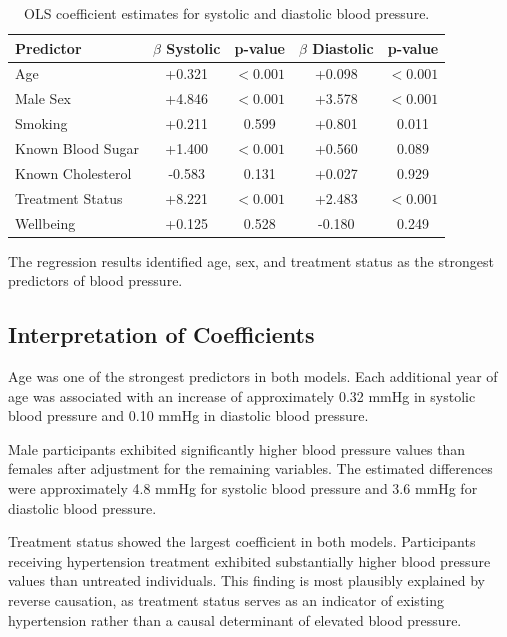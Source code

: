 \documentclass[12pt,a4paper]{article}
\begin{document}
\begin{table}[H]
\centering
\caption{OLS coefficient estimates for systolic and diastolic blood pressure.}
\label{tab:ols_coefficients}
\small
\begin{tabular}{lcccc}
\toprule
Predictor & $\beta$ Systolic & p-value & $\beta$ Diastolic & p-value \\
\midrule
Age & +0.321 & $<0.001$ & +0.098 & $<0.001$ \\

Male Sex & +4.846 & $<0.001$ & +3.578 & $<0.001$ \\

Smoking & +0.211 & 0.599 & +0.801 & 0.011 \\

Known Blood Sugar & +1.400 & $<0.001$ & +0.560 & 0.089 \\

Known Cholesterol & -0.583 & 0.131 & +0.027 & 0.929 \\

Treatment Status & +8.221 & $<0.001$ & +2.483 & $<0.001$ \\

Wellbeing & +0.125 & 0.528 & -0.180 & 0.249 \\
\bottomrule
\end{tabular}
\end{table}
The regression results identified age, sex, and treatment status as the strongest predictors of blood pressure.
\subsection{Interpretation of Coefficients}

Age was one of the strongest predictors in both models. Each additional year of age was associated with an increase of approximately 0.32 mmHg in systolic blood pressure and 0.10 mmHg in diastolic blood pressure.

Male participants exhibited significantly higher blood pressure values than females after adjustment for the remaining variables. The estimated differences were approximately 4.8 mmHg for systolic blood pressure and 3.6 mmHg for diastolic blood pressure.

Treatment status showed the largest coefficient in both models. Participants receiving hypertension treatment exhibited substantially higher blood pressure values than untreated individuals. This finding is most plausibly explained by reverse causation, as treatment status serves as an indicator of existing hypertension rather than a causal determinant of elevated blood pressure.
\end{document}
